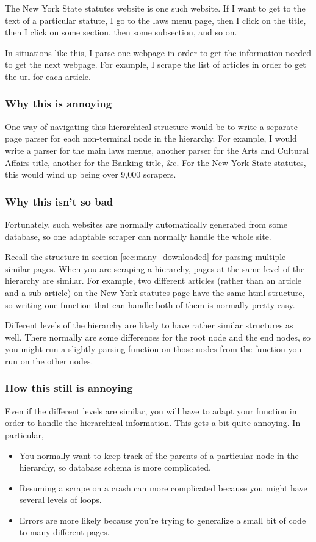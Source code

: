 \documentclass{article}
\begin{document}
The New York State statutes website is one such website. If I want to
get to the text of a particular statute, I go to the laws menu page,
then I click on the title, then I click on some section, then some
subsection, and so on.

In situations like this, I parse one webpage in order to get the information
needed to get the next webpage. For example, I scrape the list of articles
in order to get the url for each article.

\subsubsection{Why this is annoying}
One way of navigating this hierarchical structure would be to write a
separate page parser for each non-terminal node in the hierarchy.
For example, I would write a parser for the main laws menue, another
parser for the Arts and Cultural Affairs title, another for the Banking
title, \&c. For the New York State statutes, this would wind up being
over 9,000 scrapers.

\subsubsection{Why this isn't so bad}
Fortunately, such websites are normally automatically generated from
some database, so one adaptable scraper can normally handle the whole site.

Recall the structure in section \ref{sec:many_downloaded}
for parsing multiple similar pages. When you are scraping a hierarchy,
pages at the same level of the hierarchy are similar.
For example, two different articles (rather than an article and a sub-article)
on the New York statutes page have the same html structure,
so writing one function that can handle both of them is normally pretty easy.

Different levels of the hierarchy are likely to have rather similar
structures as well. There normally are some differences for the root
node and the end nodes, so you might run a slightly parsing function
on those nodes from the function you run on the other nodes.

\subsubsection{How this still is annoying}
Even if the different levels are similar, you will have to adapt your
function in order to handle the hierarchical information. This gets
a bit quite annoying. In particular,
\begin{itemize}
\item You normally want to keep track of the parents of a particular
node in the hierarchy, so database schema is more complicated.
\item Resuming a scrape on a crash can more complicated because you might
have several levels of loops.
\item Errors are more likely because you're trying to generalize a small
bit of code to many different pages.
\end{itemize}
\end{document}
